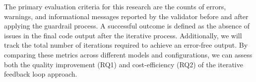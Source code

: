 
The primary evaluation criteria for this research are the counts of errors, warnings, and informational messages reported by the validator before and after applying the guardrail process. A successful outcome is defined as the absence of issues in the final code output after the iterative process. Additionally, we will track the total number of iterations required to achieve an error-free output. By comparing these metrics across different models and configurations, we can assess both the quality improvement (RQ1) and cost-efficiency (RQ2) of the iterative feedback loop approach.





